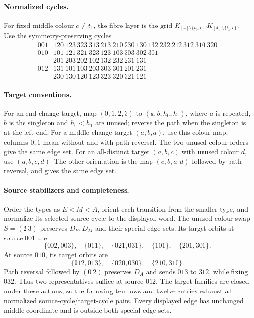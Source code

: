 \paragraph{Normalized cycles.}
For fixed middle colour $c\ne t_1$, the fibre layer is the grid
$K_{[4]\setminus\{t_0,c\}}\square
 K_{[4]\setminus\{t_2,c\}}$.
Use the symmetry-preserving cycles
\[
\begin{array}{c|l}
001&120\ 123\ 323\ 313\ 213\ 210\ 230\ 130\ 132\ 232\ 212\ 312\ 310\ 320\\[2pt]
010&101\ 121\ 321\ 323\ 123\ 103\ 303\ 302\ 301\\
   &201\ 203\ 202\ 102\ 132\ 232\ 231\ 131\\[2pt]
012&131\ 101\ 103\ 203\ 303\ 301\ 201\ 231\\
   &230\ 130\ 120\ 123\ 323\ 320\ 321\ 121
\end{array}
\]

\paragraph{Target conventions.}
For an end-change target, map $(0,1,2,3)$ to $(a,b,h_0,h_1)$,
where $a$ is repeated, $b$ is the singleton and $h_0<h_1$ are unused;
reverse the path when the singleton is at the left end.
For a middle-change target $(a,b,a)$, use this colour map; columns
$0,1$ mean without and with path reversal. The two unused-colour
orders give the same edge set.
For an all-distinct target $(a,b,c)$ with unused colour $d$, use
$(a,b,c,d)$. The other orientation is the map $(c,b,a,d)$ followed
by path reversal, and gives the same edge set.

\paragraph{Source stabilizers and completeness.}
Order the types as $E<M<A$, orient each transition from the smaller
type, and normalize its selected source cycle to the displayed word.
The unused-colour swap $S=(2\ 3)$ preserves $D_E,D_M$ and their
special-edge sets. Its target orbits at source $001$ are
\[
\{002,003\},\quad\{011\},\quad\{021,031\},\quad
\{101\},\quad\{201,301\}.
\]
At source $010$, its target orbits are
\[
\{012,013\},\quad\{020,030\},\quad\{210,310\}.
\]
Path reversal followed by $(0\ 2)$ preserves $D_A$ and sends
$013$ to $312$, while fixing $032$. Thus two representatives suffice
at source $012$. The target families are closed under these actions,
so the following ten rows and twelve entries exhaust all normalized
source-cycle/target-cycle pairs. Every displayed edge has unchanged
middle coordinate and is outside both special-edge sets.

